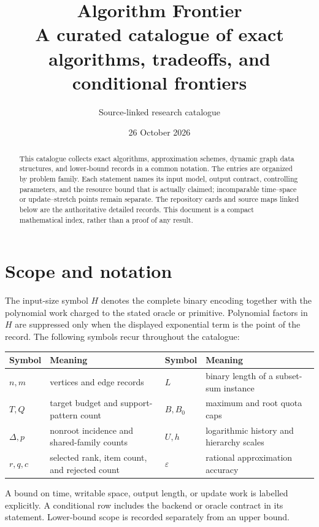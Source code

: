 \documentclass[10pt,a4paper]{article}
\title{\vspace{-1.2em}\textbf{Algorithm Frontier}\\[0.25em]
  \large A curated catalogue of exact algorithms, tradeoffs, and conditional frontiers}
\author{\normalsize Source-linked research catalogue}
\date{26 October 2026}
\newcommand{\eps}{\varepsilon}
\theoremstyle{recordstyle}
\begin{document}
\maketitle
\thispagestyle{empty}

\begin{abstract}
This catalogue collects exact algorithms, approximation schemes, dynamic graph
data structures, and lower-bound records in a common notation.  The entries are
organized by problem family.  Each statement names its input model, output
contract, controlling parameters, and the resource bound that is actually
claimed; incomparable time--space or update--stretch points remain separate.
The repository cards and source maps linked below are the authoritative detailed
records.  This document is a compact mathematical index, rather than a proof
of any result.
\end{abstract}

\section{Scope and notation}
The input-size symbol $H$ denotes the complete binary encoding together with
the polynomial work charged to the stated oracle or primitive.  Polynomial
factors in $H$ are suppressed only when the displayed exponential term is the
point of the record.  The following symbols recur throughout the catalogue:

\begin{center}
\begin{tabularx}{0.96\linewidth}{@{}P{18mm}Y P{18mm}Y@{}}
\toprule
Symbol & Meaning & Symbol & Meaning\\
\midrule
$n,m$ & vertices and edge records & $L$ & binary length of a subset-sum instance\\
$T,Q$ & target budget and support-pattern count & $B,B_0$ & maximum and root quota caps\\
$\Delta,p$ & nonroot incidence and shared-family counts & $U,h$ & logarithmic history and hierarchy scales\\
$r,q,c$ & selected rank, item count, and rejected count & $\eps$ & rational approximation accuracy\\
\bottomrule
\end{tabularx}
\end{center}

A bound on time, writable space, output length, or update work is labelled
explicitly.  A conditional row includes the backend or oracle contract in its
statement.  Lower-bound scope is recorded separately from an upper bound.
\end{document}
